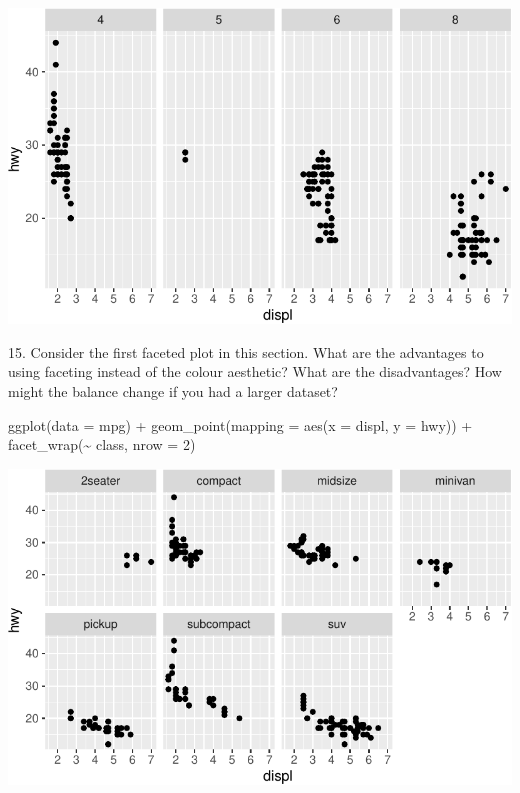 \documentclass[
  letterpaper,
  DIV=11,
  numbers=noendperiod]{scrreprt}
\newenvironment{Shaded}{\begin{snugshade}}{\end{snugshade}}
\newcommand{\AttributeTok}[1]{\textcolor[rgb]{0.40,0.45,0.13}{#1}}
\newcommand{\DecValTok}[1]{\textcolor[rgb]{0.68,0.00,0.00}{#1}}
\newcommand{\FunctionTok}[1]{\textcolor[rgb]{0.28,0.35,0.67}{#1}}
\newcommand{\NormalTok}[1]{\textcolor[rgb]{0.00,0.23,0.31}{#1}}
\newcommand{\SpecialCharTok}[1]{\textcolor[rgb]{0.37,0.37,0.37}{#1}}
\begin{document}
\includegraphics{Beginning_Data_Visualization_files/figure-pdf/Ex 14-2.pdf}

15. Consider the first faceted plot in this section. What are the
advantages to using faceting instead of the colour aesthetic? What are
the disadvantages? How might the balance change if you had a larger
dataset?

\begin{Shaded}
\begin{Highlighting}[]
\FunctionTok{ggplot}\NormalTok{(}\AttributeTok{data =}\NormalTok{ mpg) }\SpecialCharTok{+} 
  \FunctionTok{geom\_point}\NormalTok{(}\AttributeTok{mapping =} \FunctionTok{aes}\NormalTok{(}\AttributeTok{x =}\NormalTok{ displ, }\AttributeTok{y =}\NormalTok{ hwy)) }\SpecialCharTok{+} 
  \FunctionTok{facet\_wrap}\NormalTok{(}\SpecialCharTok{\textasciitilde{}}\NormalTok{ class, }\AttributeTok{nrow =} \DecValTok{2}\NormalTok{)}
\end{Highlighting}
\end{Shaded}

\includegraphics{Beginning_Data_Visualization_files/figure-pdf/Ex15-1.pdf}
\end{document}
